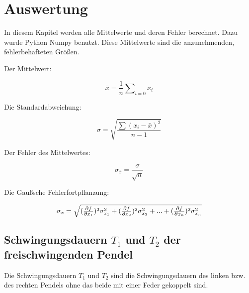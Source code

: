 \section{Auswertung}
\label{sec:Auswertung}
In diesem Kapitel werden alle Mittelwerte und deren Fehler berechnet. 
Dazu wurde Python Numpy benutzt. Diese Mittelwerte sind die anzunehmenden, fehlerbehafteten Größen.

Der Mittelwert:
\begin{center}
  \begin{equation}
    \label{eq:Mittelwert}
  \bar{x}=\frac{1}{n}\sum\nolimits_{i=0} x_i
  \end{equation} 
\end{center}

Die Standardabweichung:
\begin{center}
  \begin{equation}
    \label{eq:standardabweichung}
  
    \sigma=\sqrt{\frac{\sum(x_i-\bar{x})^2}{n-1}}
  \end{equation}

  
\end{center}

Der Fehler des Mittelwertes:
\begin{center}
  \begin{equation}
    \label{eq:mittelwertfehler}
    \sigma_{\bar{x}}=\frac{\sigma}{\sqrt{n}}
  \end{equation}

  
\end{center}

Die Gaußsche Fehlerfortpflanzung:
\begin{center}
  \begin{equation}
  \label{eq:gaussfehler}  
  
  $$\sigma_x=\sqrt{(\frac{\partial f}{\partial x_1})^2\sigma_{x_1}^2+(\frac{\partial f}{\partial x_2})^2\sigma_{x_2}^2+...+(\frac{\partial f}{\partial x_n})^2\sigma_{x_n}^2}$$
\end{equation}
\end{center}



\subsection{Schwingungsdauern $T_1$ und $T_2$ der  freischwingenden Pendel}
Die Schwingungsdauern $T_1$ und $T_2$ sind die Schwingungsdauern des linken bzw. des rechten Pendels ohne das
beide mit einer Feder gekoppelt sind.

